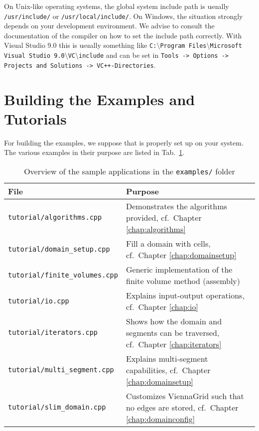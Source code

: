 On Unix-like operating systems, the global system include path is usually \lstinline|/usr/include/| or \lstinline|/usr/local/include/|.
On Windows, the situation strongly depends on your development environment. We
advise to consult the documentation of the compiler on how to set the include
path correctly. With Visual Studio 9.0 this is usually something like
\texttt{C:$\setminus$Program Files$\setminus$Microsoft Visual Studio
9.0$\setminus$VC$\setminus$include}
and can be set in \texttt{Tools -> Options -> Projects and Solutions ->
VC++-\-Directories}. 


\section{Building the Examples and Tutorials}
For building the examples, we suppose that {\CMake} is properly set up
on your system. The various examples in their purpose are listed in
Tab.~\ref{tab:tutorial-dependencies}.

\begin{table}[tb]
\begin{center}
\begin{tabular}{l|p{9.3cm}}
File & Purpose\\
\hline
\texttt{tutorial/algorithms.cpp}      & Demonstrates the algorithms provided, cf.~Chapter \ref{chap:algorithms} \\
\texttt{tutorial/domain\_setup.cpp}   & Fill a domain with cells, cf.~Chapter \ref{chap:domainsetup} \\
\texttt{tutorial/finite\_volumes.cpp} & Generic implementation of the finite volume method (assembly) \\
\texttt{tutorial/io.cpp}              & Explains input-output operations, cf.~Chapter \ref{chap:io} \\
\texttt{tutorial/iterators.cpp}       & Shows how the domain and segments can be traversed, cf.~Chapter \ref{chap:iterators} \\
\texttt{tutorial/multi\_segment.cpp}  & Explains multi-segment capabilities, cf.~Chapter \ref{chap:domainsetup} \\
\texttt{tutorial/slim\_domain.cpp}    & Customizes ViennaGrid such that no edges are stored, cf.~Chapter \ref{chap:domainconfig} \\
\end{tabular}
\caption{Overview of the sample applications in the \texttt{examples/} folder}
\label{tab:tutorial-dependencies}
\end{center}
\end{table}


